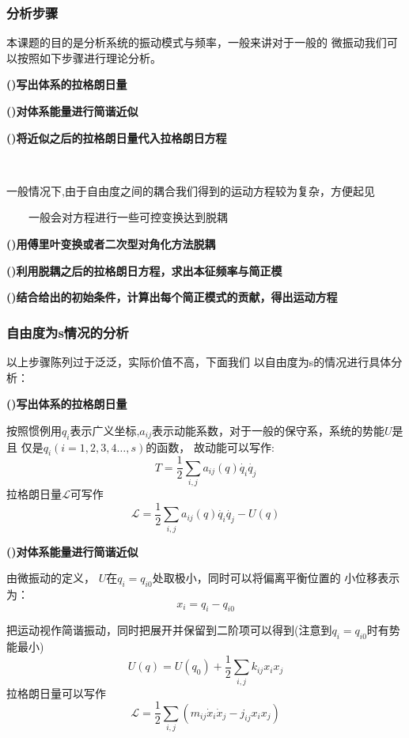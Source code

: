 \documentclass[11pt, a4paper, oneside]{ctexart}
\begin{document}
\subsubsection{分析步骤}
{本课题的目的是分析系统的振动模式与频率，一般来讲对于一般的
微振动我们可以按照如下步骤进行理论分析。\cite{h}

\textbf{()写出体系的拉格朗日量}

\textbf{()对体系能量进行简谐近似}

\textbf{()将近似之后的拉格朗日量代入拉格朗日方程}


$\qquad${一般情况下,由于自由度之间的耦合我们得到的运动方程较为复杂，方便起见

$\qquad$一般会对方程进行一些可控变换达到脱耦}

\textbf{()用傅里叶变换或者二次型对角化方法脱耦}

\textbf{()利用脱耦之后的拉格朗日方程，求出本征频率与简正模}

\textbf{()结合给出的初始条件，计算出每个简正模式的贡献，得出运动方程}




\subsubsection{自由度为s情况的分析}

以上步骤陈列过于泛泛，实际价值不高，下面我们
以自由度为s的情况进行具体分析：\cite{h}\cite{i}

\textbf{()写出体系的拉格朗日量}

按照惯例用$q_i$表示广义坐标,$a_{ij}$表示动能系数，对于一般的保守系，系统的势能$U$是且
仅是$q_i(i=1,2,3,4\dots,s)$的函数，
故动能可以写作:
\begin{equation}
    T = \frac{1}{2}\sum_{i,j}a_{ij}(q)\dot{q_i}\dot{q_j} 
\end{equation}
拉格朗日量$\mathscr{L}$可写作
\begin{equation}
    \mathscr{L} = \frac{1}{2}\sum_{i,j}a_{ij}(q)\dot{q_i}\dot{q_j} -U(q)
\end{equation}

\textbf{()对体系能量进行简谐近似}

由微振动的定义，
$U$在$q_i = q_{i0}$处取极小，同时可以将偏离平衡位置的
小位移表示为：
\begin{equation}
    x_i = q_i - q_{i0}
\end{equation}

把运动视作简谐振动，同时把展开并保留到二阶项可以得到(注意到$q_i=q_{i0}$时有势能最小)
\begin{equation}
    U (q)= U(q_0)+\frac{1}{2}\sum _{i,j}  k_{ij}x_ix_j
\end{equation}
拉格朗日量可以写作
\begin{equation}
    \mathscr{L} = \frac{1}{2}\sum_{i,j}(m_{ij}\dot x_i \dot x_j
    -j_{ij}x_ix_j)
\end{equation}


}
\end{document}
